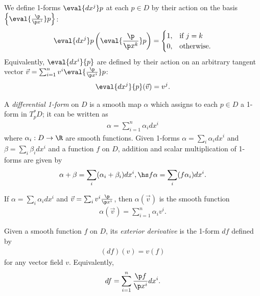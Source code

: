 \documentclass{article}
\begin{document}
\begin{definition}
    We define 1-forms $\eval{dx^j}p$ at each $p\in D$ by their action on the basis
    $\left\lbrace\eval{\frac{\p }{\p x^i}}p\right\rbrace$:
    \begin{align*}
        \eval{dx^j}p\left(\eval{\frac{\p }{\p x^k}}p\right)= \begin{cases}
            1, &\text{if } j = k\\
            0, &\text{otherwise}.
        \end{cases}
    \end{align*}
    Equivalently, $\eval{dx^i}{p}$ are defined by their action on an arbitrary tangent vector
    $\vec v = \sum_{i=1}^n v^i\eval{\frac{\p }{\p x^i}}p$:
    \begin{align*}
        \eval{dx^j}{p}(\vec v) = v^j.
    \end{align*}
\end{definition}

\begin{definition}
    A \emph{differential 1-form} on $D$ is a smooth map $\alpha$ which assigns to each $p\in D$
    a 1-form in $T^*_pD$; it can be written as
    \begin{align*}
        \alpha = \sum_{i=1}^n\alpha_i dx^i
    \end{align*}
    where $\alpha_i:D\to\R$ are smooth functions. Given 1-forms $\alpha=\sum_i\alpha_idx^i$ and 
    $\beta=\sum_i\beta_idx^i$ and a function $f$ on $D$, addition and scalar multiplication of 
    1-forms are given by
    \begin{align*}
        \alpha + \beta = \sum_i (\alpha_i + \beta_i)dx^i,\hs f\alpha = \sum_i (f\alpha_i)dx^i.
    \end{align*}
\end{definition}

\begin{lemma}
    If $\alpha=\sum_i\alpha_i dx^i$ and $\vec v = \sum_i v^i\frac{\p }{\p x^i}$, then $\alpha(\vec v)$
    is the smooth function
    \begin{align*}
        \alpha(\vec v) = \sum_{i=1}^n \alpha_i v^i.    
    \end{align*}
\end{lemma}

\begin{definition}
    Given a smooth function $f$ on $D$, its \emph{exterior derivative} is the 1-form $df$ defined by
    \begin{align*}
        (df)(v) = v(f)
    \end{align*}
    for any vector field $v$. Equivalently,
    \begin{align*}
        df=\sum_{i=1}^n \frac{\p f}{\p x^i}dx^i.
    \end{align*}
\end{definition}
\end{document}
